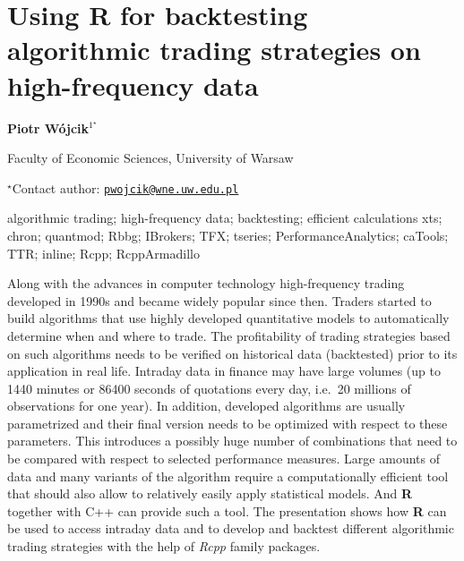 \documentclass[\main/boa.tex]{subfiles}
\begin{document}
\section{Using R for backtesting algorithmic trading strategies on high-frequency
data}

\begin{center}
  {\bf Piotr Wójcik$^{1^\star}$}
\end{center}

\vskip 0.3cm

\begin{affiliations}
\begin{enumerate}
\begin{minipage}{0.915\textwidth}
\centering
\item Faculty of Economic Sciences, University of Warsaw \\[-2pt]
\end{minipage}
\end{enumerate}
$^\star$Contact author: \href{mailto:pwojcik@wne.uw.edu.pl}{\nolinkurl{pwojcik@wne.uw.edu.pl}}\\
\end{affiliations}

\vskip 0.5cm

\begin{minipage}{0.915\textwidth}
\keywords algorithmic trading; high-frequency data; backtesting; efficient
calculations
\packages xts; chron; quantmod; Rbbg; IBrokers; TFX; tseries;
PerformanceAnalytics; caTools; TTR; inline; Rcpp; RcppArmadillo
\end{minipage}

\vskip 0.8cm

Along with the advances in computer technology high-frequency trading
developed in 1990s and became widely popular since then. Traders started
to build algorithms that use highly developed quantitative models to
automatically determine when and where to trade. The profitability of
trading strategies based on such algorithms needs to be verified on
historical data (backtested) prior to its application in real life.
Intraday data in finance may have large volumes (up to 1440 minutes or
86400 seconds of quotations every day, i.e.~20 millions of observations
for one year). In addition, developed algorithms are usually
parametrized and their final version needs to be optimized with respect
to these parameters. This introduces a possibly huge number of
combinations that need to be compared with respect to selected
performance measures. Large amounts of data and many variants of the
algorithm require a computationally efficient tool that should also
allow to relatively easily apply statistical models. And \textbf{R}
together with C++ can provide such a tool. The presentation shows how
\textbf{R} can be used to access intraday data and to develop and
backtest different algorithmic trading strategies with the help of
\emph{Rcpp} family packages.
\end{document}
